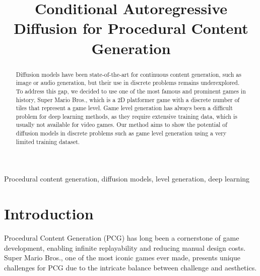 \documentclass[conference]{IEEEtran}
\begin{document}
\title{Conditional Autoregressive Diffusion for Procedural Content Generation}

\author{



}

\maketitle

\begin{abstract}
Diffusion models have been state-of-the-art for continuous content generation, such as image or audio generation, but their use in discrete problems remains underexplored. To address this gap, we decided to use one of the most famous and prominent games in history, Super Mario Bros., which is a 2D platformer game with a discrete number of tiles that represent a game level. Game level generation has always been a difficult problem for deep learning methods, as they require extensive training data, which is usually not available for video games. Our method aims to show the potential of diffusion models in discrete problems such as game level generation using a very limited training dataset.
\end{abstract}

\begin{IEEEkeywords}
Procedural content generation, diffusion models, level generation, deep learning
\end{IEEEkeywords}

\section{Introduction}
Procedural Content Generation (PCG) has long been a cornerstone of game development, enabling infinite replayability and reducing manual design costs. Super Mario Bros., one of the most iconic games ever made, presents unique challenges for PCG due to the intricate balance between challenge and aesthetics.
\end{document}
